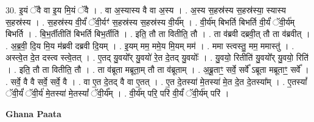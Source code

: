 \documentclass[17pt]{extarticle}
\begin{document}
30. इ॒यं ॅवै वा इ॒य मि॒यं ॅवै । . वा अ॒स्यास्य वै वा अ॒स्य । . अ॒स्य स॒हस्र॑स्य स॒हस्र॑स्या॒ स्यास्य स॒हस्र॑स्य । . स॒हस्र॑स्य वी॒र्यं॑ ॅवी॒र्यꣳ॑ स॒हस्र॑स्य स॒हस्र॑स्य वी॒र्य᳚म् । . वी॒र्य॑म् बिभर्ति बिभर्ति वी॒र्यं॑ ॅवी॒र्य॑म् बिभर्ति । . बि॒भ॒र्तीतीति॑ बिभर्ति बिभ॒र्तीति॑ । . इति॒ तौ ता वितीति॒ तौ । . ता व॑ब्रवी दब्रवी॒त् तौ ता व॑ब्रवीत् । . अ॒ब्र॒वी॒ दि॒य मि॒य म॑ब्रवी दब्रवी दि॒यम् । . इ॒यम् मम॒ ममे॒य मि॒यम् मम॑ । . ममा स्त्वस्तु॒ मम॒ ममास्तु॑ । . अस्त्वे॒त दे॒त दस्त्व स्त्वे॒तत् । . ए॒तद् यु॒वयो᳚र् यु॒वयो॑ रे॒त दे॒तद् यु॒वयोः᳚ । . यु॒वयो॒ रितीति॑ यु॒वयो᳚र् यु॒वयो॒ रिति॑ । . इति॒ तौ ता वितीति॒ तौ । . ता व॑ब्रूता मब्रूता॒म् तौ ता व॑ब्रूताम् । . अ॒ब्रू॒ताꣳ॒॒ सर्वे॒ सर्वे᳚ ऽब्रूता मब्रूताꣳ॒॒ सर्वे᳚ । . सर्वे॒ वै वै सर्वे॒ सर्वे॒ वै । . वा ए॒त दे॒तद् वै वा ए॒तत् । . ए॒त दे॒तस्या॑ मे॒तस्या॑ मे॒त दे॒त दे॒तस्या᳚म् । . ए॒तस्यां᳚ ॅवी॒र्यं॑ ॅवी॒र्य॑ मे॒तस्या॑ मे॒तस्यां᳚ ॅवी॒र्य᳚म् । . वी॒र्य॑म् परि॒ परि॑ वी॒र्यं॑ ॅवी॒र्य॑म् परि॑ । \newline

\textbf{Ghana Paata } \newline
\end{document}
